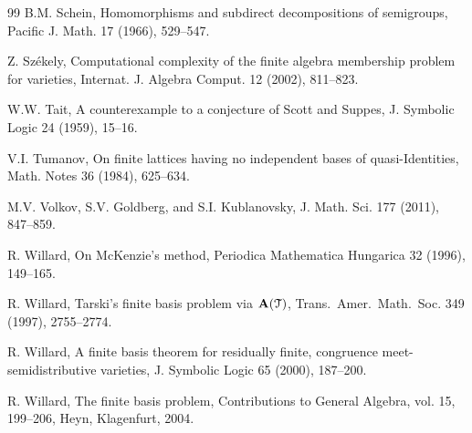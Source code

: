 \documentclass[10pt,a4paper]{amsart}
\theoremstyle{plain}
\theoremstyle{definition}
\begin{document}
\begin{thebibliography}{99}
 B.M. Schein, Homomorphisms and subdirect decompositions of semigroups, Pacific J. Math. 17 (1966), 529--547.

 Z. Sz\'ekely, Computational complexity of the finite algebra membership problem for varieties, Internat. J. Algebra Comput. 12 (2002), 811--823.

 W.W. Tait, A counterexample to a conjecture of Scott and Suppes, J. Symbolic Logic 24 (1959), 15--16.

 V.I. Tumanov, On finite lattices having no independent
bases of quasi-Identities, Math. Notes 36 (1984), 625--634.

 M.V. Volkov, S.V. Goldberg, and S.I. Kublanovsky, J. Math. Sci. 177 (2011), 847--859.

 R. Willard, On McKenzie's method, Periodica Mathematica Hungarica 32 (1996), 149--165.

R. Willard, Tarski's finite basis problem
via ${\bf A}(\mathcal{T})$, {Trans.\ Amer.\ Math.\ Soc.} {349} (1997), 2755--2774.

 R. Willard, A finite basis theorem for residually finite, congruence meet-semidistributive varieties, J. Symbolic Logic 65 (2000), 187--200.


 R. Willard, The finite basis problem, Contributions to General Algebra, vol. 15, 199--206, Heyn, Klagenfurt, 2004.



\end{thebibliography}
\end{document}
